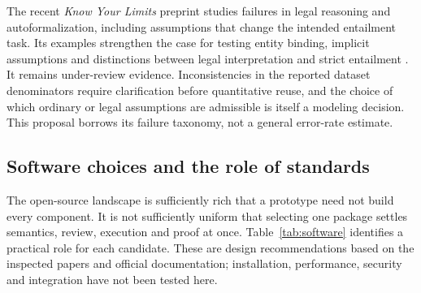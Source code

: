 The recent \emph{Know Your Limits} preprint studies failures in legal reasoning
and autoformalization, including assumptions that change the intended entailment
task. Its examples strengthen the case for testing entity binding, implicit
assumptions and distinctions between legal interpretation and strict entailment
\citep[secs.~3--5]{limits2026}. It remains under-review evidence. Inconsistencies
in the reported dataset denominators require clarification before quantitative
reuse, and the choice of which ordinary or legal assumptions are admissible is
itself a modeling decision. This proposal borrows its failure taxonomy, not a
general error-rate estimate.

\subsection{Software choices and the role of standards}

The open-source landscape is sufficiently rich that a prototype need not build
every component. It is not sufficiently uniform that selecting one package
settles semantics, review, execution and proof at once. Table~\ref{tab:software}
identifies a practical role for each candidate. These are design recommendations
based on the inspected papers and official documentation; installation,
performance, security and integration have not been tested here.

